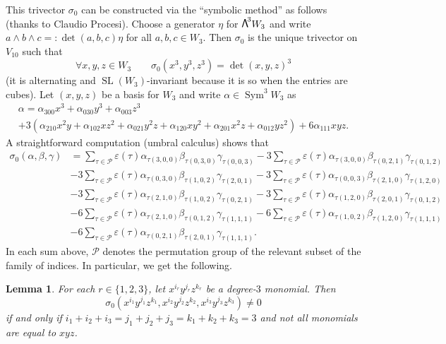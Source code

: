 \documentclass[JEP,XML,SOM,Unicode, NoEqCountersInSection,NoFloatCountersInSection]{cedram}
\let\mathcal\mathscr
\newtheorem{lemm}{Lemma}[section]
\theoremstyle{definition}
\newcommand\cP{\mathcal{P}}
\let\eps\varepsilon
\DeclareMathOperator{\Sym}{Sym}
\DeclareMathOperator{\SL}{SL}
\newcommand\bw[1]{{\hbox{\large$\mathsf{\Lambda}$}^{\!#1}}}
\begin{document}
This trivector $\sigma_0$ can be constructed via the ``symbolic method'' as follows (thanks to Claudio Procesi). Choose a generator $\eta$ for $\bw3W_3$ and write $a\wedge b\wedge c=:\det(a,b,c)\eta$ for all $a,b,c\in W_3$. Then $\sigma_0$ is the unique trivector on $V_{10} $ such that
\[
\forall x,y,z\in W_3\qquad \sigma_0(x^3,y^3,z^3)= \det(x,y,z)^3
\]
(it is alternating and $\SL(W_3)$-invariant because it is so when the entries are cubes). Let $(x,y,z)$ be a basis for $W_3$ and
write $\alpha\in \Sym^3\! W_{3}$ as\vspace*{-5pt}
\begin{multline}\label{coordsim}
\alpha=\alpha_{300}x^3+\alpha_{030}y^3+\alpha_{003}z^3 \\
+3(\alpha_{210}x^2 y+\alpha_{102}x z^2+\alpha_{021}y^2 z+\alpha_{120} x y^2+\alpha_{201}x^2 z
+\alpha_{012}y z^2)+6\alpha_{111}xyz.
\end{multline}
A straightforward computation (umbral calculus) shows that
\begin{align}\label{gransomma}\nonumber
\sigma_0(\alpha,\beta,\gamma)&=\sum\limits_{\tau\in\cP}\eps(\tau)\alpha_{\tau(3,0,0)} \beta_{\tau(0,3,0)} \gamma_{\tau(0,0,3)}
- 3\sum\limits_{\tau\in\cP}\eps(\tau)\alpha_{\tau(3,0,0)} \beta_{\tau(0,2,1)} \gamma_{\tau(0,1,2)} \\\nonumber
&- 3\sum\limits_{\tau\in\cP}\eps(\tau)\alpha_{\tau(0,3,0)} \beta_{\tau(1,0,2)} \gamma_{\tau(2,0,1)}
- 3\sum\limits_{\tau\in\cP}\eps(\tau)\alpha_{\tau(0,0,3)} \beta_{\tau(2,1,0)} \gamma_{\tau(1,2,0)} \\
&-3\sum\limits_{\tau\in\cP}\eps(\tau)\alpha_{\tau(2,1,0)} \beta_{\tau(1,0,2)} \gamma_{\tau(0,2,1)}
-3\sum\limits_{\tau\in\cP}\eps(\tau)\alpha_{\tau(1,2,0)} \beta_{\tau(2,0,1)} \gamma_{\tau(0,1,2)} \\\nonumber
&- 6\sum\limits_{\tau\in\cP}\eps(\tau)\alpha_{\tau(2,1,0)} \beta_{\tau(0,1,2)} \gamma_{\tau(1,1,1)}
- 6\sum\limits_{\tau\in\cP}\eps(\tau)\alpha_{\tau(1,0,2)} \beta_{\tau(1,2,0)} \gamma_{\tau(1,1,1)} \\\nonumber
&- 6\sum\limits_{\tau\in\cP}\eps(\tau)\alpha_{\tau(0,2,1)} \beta_{\tau(2,0,1)} \gamma_{\tau(1,1,1)}.
\end{align}
In each sum above, $\cP$ denotes the permutation group of the relevant subset of the family of indices.
In particular, we get the following.

\begin{lemm}\label{nonzero}
For each $r\in\{1,2,3\}$, let $x^{i_r}y^{j_r}z^{k_r}$ be a degree-$3$ monomial. Then
\[
\sigma_0(x^{i_1}y^{j_1}z^{k_1},x^{i_2}y^{j_2}z^{k_2},x^{i_3}y^{j_3}z^{k_3})\ne0
\]
if and only if $i_1+i_2+i_3=j_1+j_2+j_3=k_1+k_2+k_3=3$ and not all monomials are equal to $xyz$.
\end{lemm}
\end{document}
